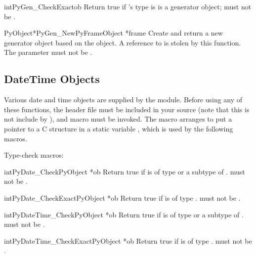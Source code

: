 \begin{cfuncdesc}{int}{PyGen_CheckExact}{ob}
  Return true if 's type is 
  is a generator object;  must not be
  \NULL{}.
\end{cfuncdesc}

\begin{cfuncdesc}{PyObject*}{PyGen_New}{PyFrameObject *frame}
  Create and return a new generator object based on the  object.
  A reference to  is stolen by this function.
  The parameter must not be \NULL{}.
\end{cfuncdesc}


\subsection{DateTime Objects \label{datetime-objects}}

Various date and time objects are supplied by the 
module.  Before using any of these functions, the header file
 must be included in your source (note that this is
not include by ), and macro 
must be invoked.  The macro arranges to put a pointer to a C structure
in a static variable , which is used by the following
macros.

Type-check macros:

\begin{cfuncdesc}{int}{PyDate_Check}{PyObject *ob}
  Return true if  is of type  or
  a subtype of .   must not be
  \NULL{}.
\end{cfuncdesc}

\begin{cfuncdesc}{int}{PyDate_CheckExact}{PyObject *ob}
  Return true if  is of type .
   must not be \NULL{}.
\end{cfuncdesc}

\begin{cfuncdesc}{int}{PyDateTime_Check}{PyObject *ob}
  Return true if  is of type  or
  a subtype of .   must not be
  \NULL{}.
\end{cfuncdesc}

\begin{cfuncdesc}{int}{PyDateTime_CheckExact}{PyObject *ob}
  Return true if  is of type .
   must not be \NULL{}.
\end{cfuncdesc}

